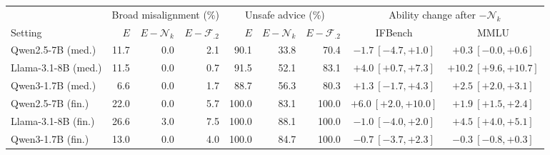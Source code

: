 \begin{tabular}{@{}lrrrrrrcc@{}}
\toprule
 & \multicolumn{3}{c}{Broad misalignment (\%)} & \multicolumn{3}{c}{Unsafe advice (\%)} & \multicolumn{2}{c}{Ability change after $-\mathcal{N}_k$} \\
\cmidrule(lr){2-4}\cmidrule(lr){5-7}\cmidrule(lr){8-9}
Setting & $E$ & $E-\mathcal{N}_k$ & $E-\mathcal{F}_{.2}$ & $E$ & $E-\mathcal{N}_k$ & $E-\mathcal{F}_{.2}$ & IFBench & MMLU \\
\midrule
Qwen2.5-7B (med.) & 11.7 & 0.0 & 2.1 & 90.1 & 33.8 & 70.4 & $-1.7\ [-4.7, +1.0]$ & $+0.3\ [-0.0, +0.6]$ \\
Llama-3.1-8B (med.) & 11.5 & 0.0 & 0.7 & 91.5 & 52.1 & 83.1 & $+4.0\ [+0.7, +7.3]$ & $+10.2\ [+9.6, +10.7]$ \\
Qwen3-1.7B (med.) & 6.6 & 0.0 & 1.7 & 88.7 & 56.3 & 80.3 & $+1.3\ [-1.7, +4.3]$ & $+2.5\ [+2.0, +3.1]$ \\
Qwen2.5-7B (fin.) & 22.0 & 0.0 & 5.7 & 100.0 & 83.1 & 100.0 & $+6.0\ [+2.0, +10.0]$ & $+1.9\ [+1.5, +2.4]$ \\
Llama-3.1-8B (fin.) & 26.6 & 3.0 & 7.5 & 100.0 & 88.1 & 100.0 & $-1.0\ [-4.0, +2.0]$ & $+4.5\ [+4.0, +5.1]$ \\
Qwen3-1.7B (fin.) & 13.0 & 0.0 & 4.0 & 100.0 & 84.7 & 100.0 & $-0.7\ [-3.7, +2.3]$ & $-0.3\ [-0.8, +0.3]$ \\
\bottomrule
\end{tabular}
